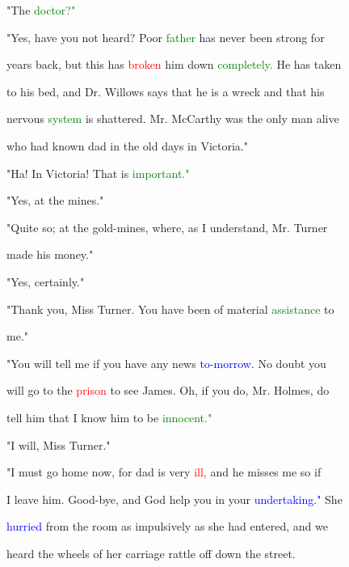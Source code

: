  "The \textcolor{green}{doctor?"}



 "Yes, have you not heard? Poor \textcolor{green}{father} has never been strong for

 years back, but this has \textcolor{red}{broken} him down \textcolor{green}{completely.} He has taken

 to his bed, and Dr. Willows says that he is a \textcolor{BurntOrange}{wreck} and that his

 \textcolor{BurntOrange}{nervous} \textcolor{green}{system} is \textcolor{BurntOrange}{shattered.} Mr. McCarthy was the only man \textcolor{BurntOrange}{alive}

 who had known dad in the old days in Victoria."



 "Ha! In Victoria! That is \textcolor{green}{important."}



 "Yes, at the mines."



 "Quite so; at the gold-mines, where, as I understand, Mr. Turner

 made his \textcolor{BurntOrange}{money."}



 "Yes, certainly."



 "Thank you, Miss Turner. You have been of material \textcolor{green}{assistance} to

 me."



 "You will tell me if you have any news \textcolor{blue}{to-morrow.} No \textcolor{BurntOrange}{doubt} you

 will go to the \textcolor{red}{prison} to see James. Oh, if you do, Mr. Holmes, do

 tell him that I know him to be \textcolor{green}{innocent."}



 "I will, Miss Turner."



 "I must go home now, for dad is very \textcolor{red}{ill,} and he misses me so if

 I \textcolor{BurntOrange}{leave} him. Good-bye, and \textcolor{BurntOrange}{God} help you in your \textcolor{blue}{undertaking."} She

 \textcolor{blue}{hurried} from the room as impulsively as she had entered, and we

 heard the wheels of her carriage rattle off down the street.



